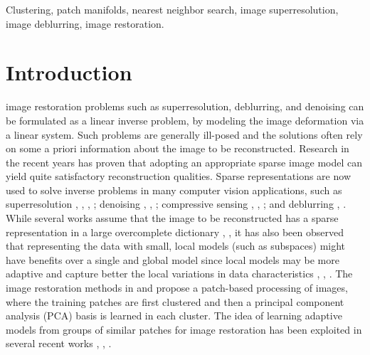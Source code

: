 \documentclass[journal]{IEEEtran}
\begin{document}
\begin{IEEEkeywords}
Clustering, patch manifolds, nearest neighbor search, image superresolution, image deblurring, image restoration.
\end{IEEEkeywords}
%
\IEEEpeerreviewmaketitle
%
%
%
%
\section{Introduction}
\label{sec:introduction}


 image restoration problems such as superresolution, deblurring, and denoising can be formulated as a linear inverse problem, by modeling the image deformation via a linear system. Such problems are generally ill-posed and the solutions often rely on some a priori information about the image to be reconstructed. Research in the recent years has proven that adopting an appropriate sparse image model can yield quite satisfactory reconstruction qualities. 
Sparse representations are now used to solve inverse problems in many computer vision applications, such as superresolution \cite{Dong13nonlocally}, \cite{Dong11image}, \cite{Yang08image}, \cite{Yang10image}; denoising  \cite{Dong13nonlocally}, \cite{Elad06image}, \cite{Dong11sparsity}; compressive sensing \cite{Donoho06compressed}, \cite{Candes06near}, \cite{Candes06robust}; and deblurring \cite{Dong13nonlocally}, \cite{Dong11image}. While several works assume that the image to be reconstructed has a sparse representation in a large overcomplete dictionary \cite{Yang10image}, \cite{Elad06image}, it has also been observed that representing the data with small, local models (such as subspaces) might have benefits over a single and global model since local models may be more adaptive and capture better the local variations in data characteristics \cite{Dong13nonlocally}, \cite{Dong11image}, \cite{Ni11example}. The image restoration methods in \cite{Dong13nonlocally} and \cite{Dong11image} propose a patch-based processing of images, where the training patches are first clustered and then a principal component analysis (PCA) basis is learned in each cluster. 
The idea of learning adaptive models from groups of similar patches for image restoration has been exploited in several recent works \cite{Salmon14poisson}, \cite{Dabov09bm3d}, \cite{Danielyan10denoising}.
\end{document}
